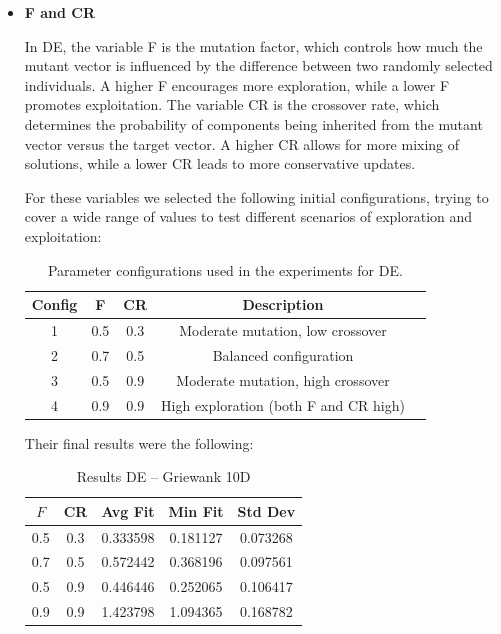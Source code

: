 \documentclass[12pt,a4paper]{article}
\begin{document}
    \begin{itemize} 
        \item \textbf{F and CR}
        
            In DE, the variable F is the mutation factor, which controls how much the mutant vector is influenced by the difference between two randomly selected individuals. A higher F encourages more exploration, while a lower F promotes exploitation. The variable CR is the crossover rate, which determines the probability of components being inherited from the mutant vector versus the target vector. A higher CR allows for more mixing of solutions, while a lower CR leads to more conservative updates.


            For these variables we selected the following initial configurations, trying to cover a wide range of values to test different scenarios of exploration and exploitation:
    
                \begin{table}[H]
                    \centering
                    \begin{tabular}{c c c c l}
                    \hline
                    \textbf{Config} & \textbf{F} & \textbf{CR} & \textbf{Description} \\
                    \hline
                    1 & 0.5 & 0.3 & Moderate mutation, low crossover \\
                    2 & 0.7 & 0.5 & Balanced configuration \\
                    3 & 0.5 & 0.9 & Moderate mutation, high crossover \\
                    4 & 0.9 & 0.9 & High exploration (both F and CR high)\\
                    \hline
                    \end{tabular}
                    \caption{Parameter configurations used in the experiments for DE.}
                \end{table}

            Their final results were the following:
                \begin{table}[H]
                    \centering
                    \begin{tabular}{c c c c c}
                    \hline
                    $F$ & CR & Avg Fit & Min Fit & Std Dev \\
                    \hline
                    0.5 & 0.3 & 0.333598 & 0.181127 & 0.073268 \\
                    0.7 & 0.5 & 0.572442 & 0.368196 & 0.097561 \\
                    0.5 & 0.9 & 0.446446 & 0.252065 & 0.106417 \\
                    0.9 & 0.9 & 1.423798 & 1.094365 & 0.168782 \\
                    \hline
                    \end{tabular}
                    \caption{Results DE – Griewank 10D}
                  

\end{table}
\end{itemize}
\end{document}
